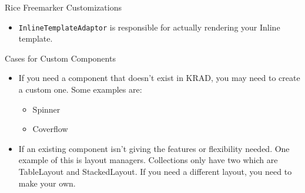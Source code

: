 \documentclass[xcolor=dvipsnames,14pt,professionalfonts]{beamer}
\begin{document}
\begin{frame}{Rice Freemarker Customizations}
  \begin{itemize}
    \item \texttt{InlineTemplateAdaptor} is responsible for actually
      rendering your Inline template.
  \end{itemize}
\end{frame}

\begin{frame}{Cases for Custom Components}
  \begin{itemize}
    \item If you need a component that doesn't exist in KRAD, you may
      need to create a custom one. Some examples are:
      \begin{itemize}
        \item Spinner
        \item Coverflow
      \end{itemize}
    \item If an existing component isn't giving the features or
      flexibility needed. One example of this is layout
      managers. Collections only have two which are TableLayout and
      StackedLayout. If you need a different layout, you need to make
      your own.
  \end{itemize}
\end{frame}
\end{document}
